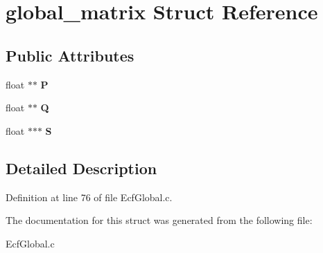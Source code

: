 \hypertarget{structglobal__matrix}{\section{global\-\_\-matrix Struct Reference}
\label{structglobal__matrix}
}
\subsection*{Public Attributes}
\begin{DoxyCompactItemize}
\item 
\hypertarget{structglobal__matrix_ae4298324bf0f5085244f52881616494d}{float $\ast$$\ast$ {\bfseries P}}\label{structglobal__matrix_ae4298324bf0f5085244f52881616494d}

\item 
\hypertarget{structglobal__matrix_a57edc741acce772d6a99ad4c56149e2c}{float $\ast$$\ast$ {\bfseries Q}}\label{structglobal__matrix_a57edc741acce772d6a99ad4c56149e2c}

\item 
\hypertarget{structglobal__matrix_a6b70f253ea81ac0df0adec1a056c139e}{float $\ast$$\ast$$\ast$ {\bfseries S}}\label{structglobal__matrix_a6b70f253ea81ac0df0adec1a056c139e}

\end{DoxyCompactItemize}


\subsection{Detailed Description}


Definition at line 76 of file Ecf\-Global.\-c.



The documentation for this struct was generated from the following file\-:\begin{DoxyCompactItemize}
\item 
Ecf\-Global.\-c\end{DoxyCompactItemize}
